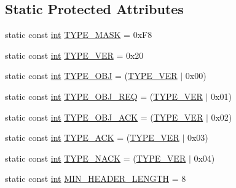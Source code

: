 \subsection*{Static Protected Attributes}
\begin{DoxyCompactItemize}
\item 
static const \hyperlink{ioapi_8h_a787fa3cf048117ba7123753c1e74fcd6}{int} \hyperlink{group___u_a_v_talk_plugin_gadad9ea7937a0ef8cf1a162fc2265e9c4}{T\-Y\-P\-E\-\_\-\-M\-A\-S\-K} = 0x\-F8
\item 
static const \hyperlink{ioapi_8h_a787fa3cf048117ba7123753c1e74fcd6}{int} \hyperlink{group___u_a_v_talk_plugin_gad838c235ec5ef5e1389791d518faa6e7}{T\-Y\-P\-E\-\_\-\-V\-E\-R} = 0x20
\item 
static const \hyperlink{ioapi_8h_a787fa3cf048117ba7123753c1e74fcd6}{int} \hyperlink{group___u_a_v_talk_plugin_ga160fa827bdb9b5114b132cf644f76d4c}{T\-Y\-P\-E\-\_\-\-O\-B\-J} = (\hyperlink{group___u_a_v_talk_plugin_gad838c235ec5ef5e1389791d518faa6e7}{T\-Y\-P\-E\-\_\-\-V\-E\-R} $|$ 0x00)
\item 
static const \hyperlink{ioapi_8h_a787fa3cf048117ba7123753c1e74fcd6}{int} \hyperlink{group___u_a_v_talk_plugin_ga5e1cb8e2b0aa00f08a16af9c858079e9}{T\-Y\-P\-E\-\_\-\-O\-B\-J\-\_\-\-R\-E\-Q} = (\hyperlink{group___u_a_v_talk_plugin_gad838c235ec5ef5e1389791d518faa6e7}{T\-Y\-P\-E\-\_\-\-V\-E\-R} $|$ 0x01)
\item 
static const \hyperlink{ioapi_8h_a787fa3cf048117ba7123753c1e74fcd6}{int} \hyperlink{group___u_a_v_talk_plugin_gafc2b2ad8c68063a80d64666d0e812572}{T\-Y\-P\-E\-\_\-\-O\-B\-J\-\_\-\-A\-C\-K} = (\hyperlink{group___u_a_v_talk_plugin_gad838c235ec5ef5e1389791d518faa6e7}{T\-Y\-P\-E\-\_\-\-V\-E\-R} $|$ 0x02)
\item 
static const \hyperlink{ioapi_8h_a787fa3cf048117ba7123753c1e74fcd6}{int} \hyperlink{group___u_a_v_talk_plugin_gaec2c5c58b05deb71a40e1248ff82aa52}{T\-Y\-P\-E\-\_\-\-A\-C\-K} = (\hyperlink{group___u_a_v_talk_plugin_gad838c235ec5ef5e1389791d518faa6e7}{T\-Y\-P\-E\-\_\-\-V\-E\-R} $|$ 0x03)
\item 
static const \hyperlink{ioapi_8h_a787fa3cf048117ba7123753c1e74fcd6}{int} \hyperlink{group___u_a_v_talk_plugin_ga809ec3528886e43e38072e2d16787668}{T\-Y\-P\-E\-\_\-\-N\-A\-C\-K} = (\hyperlink{group___u_a_v_talk_plugin_gad838c235ec5ef5e1389791d518faa6e7}{T\-Y\-P\-E\-\_\-\-V\-E\-R} $|$ 0x04)
\item 
static const \hyperlink{ioapi_8h_a787fa3cf048117ba7123753c1e74fcd6}{int} \hyperlink{group___u_a_v_talk_plugin_ga0d20c7ff6e0eedb2ab1243c6bf957fd3}{M\-I\-N\-\_\-\-H\-E\-A\-D\-E\-R\-\_\-\-L\-E\-N\-G\-T\-H} = 8

\end{DoxyCompactItemize}
